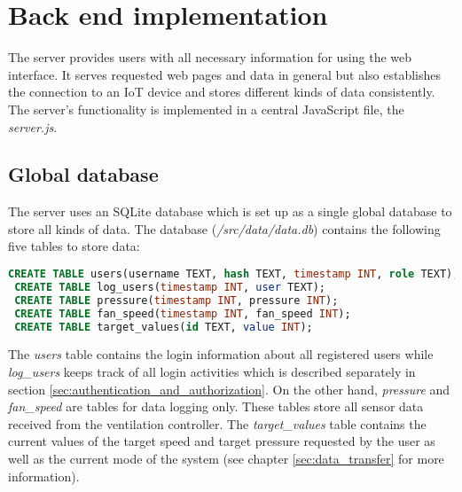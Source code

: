 \chapter{Back end implementation}
\label{ch:back_end_implementation}

The server provides users with all necessary information for using the web interface. It serves requested web pages and data in general but also establishes the connection to an IoT device and stores different kinds of data consistently. The server's functionality is implemented in a central JavaScript file, the \textit{server.js}.





\section{Global database}
\label{sec:global_database}

The server uses an SQLite database which is set up as a single global database to store all kinds of data.  The database (\textit{/src/data/data.db}) contains the following five tables to store data:

\begin{lstlisting}[language = SQL, numbers = none, label={lst:global_database}]
 CREATE TABLE users(username TEXT, hash TEXT, timestamp INT, role TEXT);
 CREATE TABLE log_users(timestamp INT, user TEXT);
 CREATE TABLE pressure(timestamp INT, pressure INT);
 CREATE TABLE fan_speed(timestamp INT, fan_speed INT);
 CREATE TABLE target_values(id TEXT, value INT);
\end{lstlisting}

The \textit{users} table contains the login information about all registered users while \textit{log\_users} keeps track of all login activities which is described separately in section \ref{sec:authentication_and_authorization}. On the other hand, \textit{pressure} and \textit{fan\_speed} are tables for data logging only. These tables store all sensor data received from the ventilation controller. The \textit{target\_values} table contains the current values of the target speed and target pressure requested by the user as well as the current mode of the system (see chapter \ref{sec:data_transfer} for more information).




